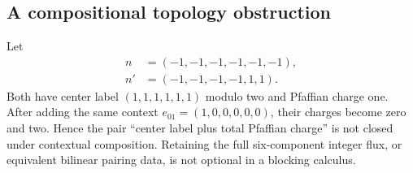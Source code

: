 \subsection{A compositional topology obstruction}

Let
\begin{align}
 n&=(-1,-1,-1,-1,-1,-1),\\
 n'&=(-1,-1,-1,-1,1,1).
\end{align}
Both have center label \((1,1,1,1,1,1)\) modulo two and Pfaffian charge one.
After adding the same context \(e_{01}=(1,0,0,0,0,0)\), their charges become
zero and two.  Hence the pair ``center label plus total Pfaffian charge'' is
not closed under contextual composition.  Retaining the full six-component
integer flux, or equivalent bilinear pairing data, is not optional in a
blocking calculus.
